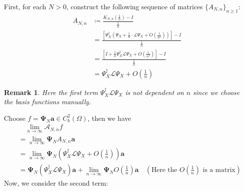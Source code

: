 \documentclass{article}[11]
\newtheorem*{remark}{Remark}
\begin{document}
First, for each $N>0$, construct the following sequence of matrices $\{A_{N,n}\}_{n\geq 1}$:
\begin{align*}
	A_{N,n} &\coloneqq \frac{ K_{N,n}\left( \tfrac{1}{n} \right)  - I }{\tfrac{1}{n}} \\
	&= \frac{ \left[\Psi_X^{\dagger}\left(\Psi_X + \tfrac{1}{n} \cdot \mathcal{L}\Psi_X + O(\tfrac{1}{n^2})\right)\right]  - I }{\tfrac{1}{n}} \\
	&= \frac{ \left[I + \tfrac{1}{n}\Psi_X^{\dagger}\mathcal{L}\Psi_X + O(\tfrac{1}{n^2})\right]  - I }{\tfrac{1}{n}} \\
	&= \Psi_X^{\dagger}\mathcal{L}\Psi_X + O(\tfrac{1}{n})
\end{align*}
\begin{remark}
	Here the first term $\Psi_X^{\dagger}\mathcal{L}\Psi_X$ is not dependent on $n$ since we choose the basis functions manually.
\end{remark}
Choose $f = \mathbf{\Psi}_N\mathbf{a} \in C_b^2(\Omega)$, then we have
\begin{align*}
	&\quad \lim_{n\to\infty} \mathcal{A}_{N,n}f \\
	&= \lim_{n\to\infty} \mathbf{\Psi}_N A_{N,n}\mathbf{a} \\
	&= \lim_{n\to\infty} \mathbf{\Psi}_N\left(\Psi_X^{\dagger}\mathcal{L}\Psi_X + O(\tfrac{1}{n})\right)\mathbf{a} \\
	&= \mathbf{\Psi}_N\left(\Psi_X^{\dagger}\mathcal{L}\Psi_X\right)\mathbf{a} + \lim_{n\to\infty} \mathbf{\Psi}_N O(\tfrac{1}{n})\mathbf{a} \quad (\text{Here the $O(\tfrac{1}{n})$ is a matrix})
\end{align*}
Now, we consider the second term:
\end{document}
